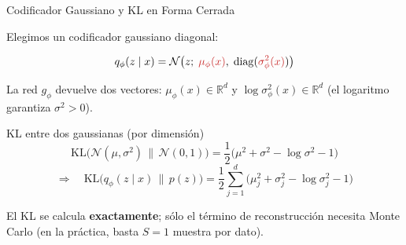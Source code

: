\documentclass[aspectratio=169, 10pt]{beamer}
\providecommand{\R}{\mathbb{R}}
\newcommand{\KL}{\mathrm{KL}}
\newcommand{\ad}[1]{{\color{AdaptRed}#1}}
\newcommand{\formula}[1]{%
	\begin{tcolorbox}[colback=UCMBlue!8, colframe=UCMBlue, arc=4pt,
		boxsep=2pt, left=6pt, right=6pt, top=3pt, bottom=3pt]
		#1
	\end{tcolorbox}
}
\begin{document}
\begin{frame}{Codificador Gaussiano y KL en Forma Cerrada}

	Elegimos un codificador gaussiano diagonal:

	\formula{
		\[
		q_\phi(z\mid x) = \mathcal{N}\big(z;\; \ad{\mu_\phi(x)},\; \mathrm{diag}(\ad{\sigma^2_\phi(x)})\big)
		\]
	}

	La red $g_\phi$ devuelve dos vectores: $\mu_\phi(x) \in \R^d$ y $\log \sigma^2_\phi(x) \in \R^d$ (el logaritmo garantiza $\sigma^2 > 0$).

	\vspace{0.2cm}

	\begin{block}{KL entre dos gaussianas (por dimensi\'on)}
		\[
		\KL\big(\mathcal{N}(\mu, \sigma^2)\,\|\,\mathcal{N}(0,1)\big)
		= \frac{1}{2}\Big(\mu^2 + \sigma^2 - \log \sigma^2 - 1\Big)
		\]
		\[
		\Rightarrow\quad
		\KL\big(q_\phi(z\mid x)\,\|\,p(z)\big) = \frac{1}{2}\sum_{j=1}^{d}\Big(\mu_j^2 + \sigma_j^2 - \log\sigma_j^2 - 1\Big)
		\]
	\end{block}

	\vspace{0.1cm}

	\small El KL se calcula \textbf{exactamente}; s\'olo el t\'ermino de reconstrucci\'on necesita Monte Carlo (en la pr\'actica, basta $S=1$ muestra por dato).

\end{frame}
\end{document}

